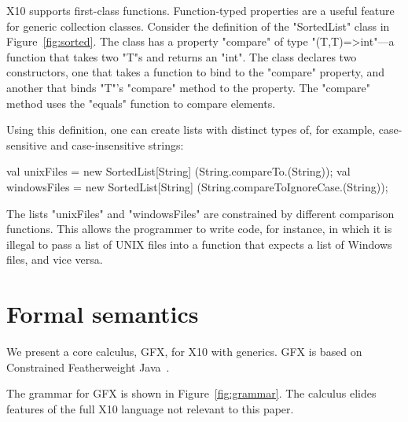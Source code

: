 \documentclass[preprint,nocopyrightspace,9pt]{sigplanconf}
\newcommand\gxx{GFX\xspace}
\begin{document}
X10 supports first-class functions.
Function-typed properties are a useful feature for generic
collection classes.  Consider the definition of the
\xcd"SortedList" class in Figure~\ref{fig:sorted}.
The class has a property \xcd"compare" of type
\xcd"(T,T)=>int"---a function that takes two \xcd"T"s and
returns an \xcd"int".  The class declares two constructors,
one that takes a function to bind to the \xcd"compare"
property, and another that binds \xcd"T"'s \xcd"compare" method to
the property.  The \xcd"compare" method uses the \xcd"equals"
function to compare elements. 

Using this definition, one can create lists with distinct types
of, for example, case-sensitive and case-insensitive strings:
\begin{xten}
val unixFiles
  = new SortedList[String]
        (String.compareTo.(String));
val windowsFiles
  = new SortedList[String]
        (String.compareToIgnoreCase.(String));
\end{xten}

\noindent
The lists \xcd"unixFiles" and \xcd"windowsFiles" are constrained
by different comparison functions.  This allows the programmer
to write code, for instance, in which it is illegal to pass a list of UNIX
files into a function that expects a list of Windows files, and
vice versa.


\section{Formal semantics}
\label{sec:semantics}

We present a core calculus, \gxx, for X10 with generics.
\gxx is based on Constrained Featherweight
Java~\cite{constrained-types}.


The grammar for \gxx is shown in 
Figure~\ref{fig:grammar}.  The calculus elides features of the
full X10 language not relevant to this paper.
\end{document}
